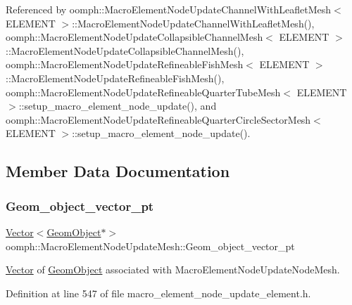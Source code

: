 Referenced by oomph\+::\+Macro\+Element\+Node\+Update\+Channel\+With\+Leaflet\+Mesh$<$ E\+L\+E\+M\+E\+N\+T $>$\+::\+Macro\+Element\+Node\+Update\+Channel\+With\+Leaflet\+Mesh(), oomph\+::\+Macro\+Element\+Node\+Update\+Collapsible\+Channel\+Mesh$<$ E\+L\+E\+M\+E\+N\+T $>$\+::\+Macro\+Element\+Node\+Update\+Collapsible\+Channel\+Mesh(), oomph\+::\+Macro\+Element\+Node\+Update\+Refineable\+Fish\+Mesh$<$ E\+L\+E\+M\+E\+N\+T $>$\+::\+Macro\+Element\+Node\+Update\+Refineable\+Fish\+Mesh(), oomph\+::\+Macro\+Element\+Node\+Update\+Refineable\+Quarter\+Tube\+Mesh$<$ E\+L\+E\+M\+E\+N\+T $>$\+::setup\+\_\+macro\+\_\+element\+\_\+node\+\_\+update(), and oomph\+::\+Macro\+Element\+Node\+Update\+Refineable\+Quarter\+Circle\+Sector\+Mesh$<$ E\+L\+E\+M\+E\+N\+T $>$\+::setup\+\_\+macro\+\_\+element\+\_\+node\+\_\+update().



\subsection{Member Data Documentation}
\mbox{\label{classoomph_1_1MacroElementNodeUpdateMesh_a146f87e49ea72db49c94fa5295d39a46}} 
\subsubsection{\texorpdfstring{Geom\+\_\+object\+\_\+vector\+\_\+pt}{Geom\_object\_vector\_pt}}
{\footnotesize\ttfamily \hyperlink{classoomph_1_1Vector}{Vector}$<$\hyperlink{classoomph_1_1GeomObject}{Geom\+Object}$\ast$$>$ oomph\+::\+Macro\+Element\+Node\+Update\+Mesh\+::\+Geom\+\_\+object\+\_\+vector\+\_\+pt\hspace{0.3cm}{\ttfamily [private]}}



\hyperlink{classoomph_1_1Vector}{Vector} of \hyperlink{classoomph_1_1GeomObject}{Geom\+Object} associated with Macro\+Element\+Node\+Update\+Node\+Mesh. 



Definition at line 547 of file macro\+\_\+element\+\_\+node\+\_\+update\+\_\+element.\+h.

